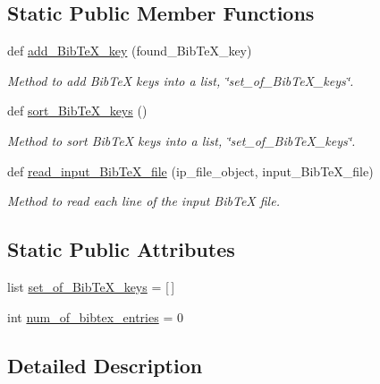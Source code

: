 \subsection*{Static Public Member Functions}
\begin{DoxyCompactItemize}
\item 
def \hyperlink{classincremental__test_1_1Incremental__Test__Automation_a14b316790ae1ef50d84bd4741a4fa020}{add\+\_\+\+Bib\+Te\+X\+\_\+key} (found\+\_\+\+Bib\+Te\+X\+\_\+key)
\begin{DoxyCompactList}\small\item\em Method to add Bib\+Te\+X keys into a list, \char`\"{}set\+\_\+of\+\_\+\+Bib\+Te\+X\+\_\+keys\char`\"{}. \end{DoxyCompactList}\item 
def \hyperlink{classincremental__test_1_1Incremental__Test__Automation_a856c60714b5d716d5eb630cbc3d55d09}{sort\+\_\+\+Bib\+Te\+X\+\_\+keys} ()
\begin{DoxyCompactList}\small\item\em Method to sort Bib\+Te\+X keys into a list, \char`\"{}set\+\_\+of\+\_\+\+Bib\+Te\+X\+\_\+keys\char`\"{}. \end{DoxyCompactList}\item 
def \hyperlink{classincremental__test_1_1Incremental__Test__Automation_a7cec6a541c4680c857a699dbe363ffbd}{read\+\_\+input\+\_\+\+Bib\+Te\+X\+\_\+file} (ip\+\_\+file\+\_\+object, input\+\_\+\+Bib\+Te\+X\+\_\+file)
\begin{DoxyCompactList}\small\item\em Method to read each line of the input Bib\+Te\+X file. \end{DoxyCompactList}\end{DoxyCompactItemize}
\subsection*{Static Public Attributes}
\begin{DoxyCompactItemize}
\item 
list \hyperlink{classincremental__test_1_1Incremental__Test__Automation_a8f5272e0488026aa24a829262392f2f7}{set\+\_\+of\+\_\+\+Bib\+Te\+X\+\_\+keys} = \mbox{[}$\,$\mbox{]}
\item 
int \hyperlink{classincremental__test_1_1Incremental__Test__Automation_ac60587acca9d28d055bd8a7198a987a1}{num\+\_\+of\+\_\+bibtex\+\_\+entries} = 0
\end{DoxyCompactItemize}


\subsection{Detailed Description}


